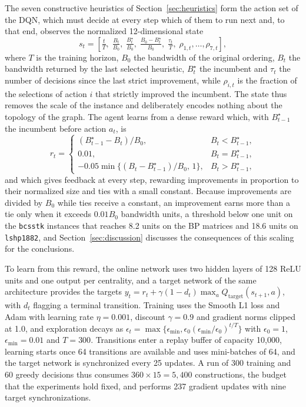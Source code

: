 \documentclass[runningheads]{llncs}
\begin{document}
The seven constructive heuristics of Section~\ref{sec:heuristics} form the action set of the DQN, which must decide at every step which of them to run next and, to that end, observes the normalized 12-dimensional state
\[
s_t =
\left[
\tfrac{t}{T},\;
\tfrac{B_t}{B_0},\;
\tfrac{B_t^\star}{B_0},\;
\tfrac{B_0-B_t^\star}{B_0},\;
\tfrac{\tau_t}{T},\;
\rho_{1,t},\ldots,\rho_{7,t}
\right],
\]
where $T$ is the training horizon, $B_0$ the bandwidth of the original ordering, $B_t$ the bandwidth returned by the last selected heuristic, $B_t^\star$ the incumbent and $\tau_t$ the number of decisions since the last strict improvement, while $\rho_{i,t}$ is the fraction of the selections of action $i$ that strictly improved the incumbent. The state thus removes the scale of the instance and deliberately encodes nothing about the topology of the graph. The agent learns from a dense reward which, with $B^\star_{t-1}$ the incumbent before action $a_t$, is
\[
r_t =
\begin{cases}
(B^\star_{t-1}-B_t)/B_0, & B_t < B^\star_{t-1},\\
0.01, & B_t = B^\star_{t-1},\\
-0.05\min\{(B_t-B^\star_{t-1})/B_0,\,1\}, & B_t > B^\star_{t-1},
\end{cases}
\]
and which gives feedback at every step, rewarding improvements in proportion to their normalized size and ties with a small constant. Because improvements are divided by $B_0$ while ties receive a constant, an improvement earns more than a tie only when it exceeds $0.01B_0$ bandwidth units, a threshold below one unit on the \texttt{bcsstk} instances that reaches 8.2 units on the BP matrices and 18.6 units on \texttt{lshp1882}, and Section~\ref{sec:discussion} discusses the consequences of this scaling for the conclusions.

To learn from this reward, the online network uses two hidden layers of 128 ReLU units and one output per centrality, and a target network of the same architecture provides the targets $y_t = r_t + \gamma (1-d_t)\max_a Q_{\mathrm{target}}(s_{t+1},a)$, with $d_t$ flagging a terminal transition. Training uses the Smooth L1 loss and Adam with learning rate $\eta = 0.001$, discount $\gamma = 0.9$ and gradient norms clipped at 1.0, and exploration decays as $\epsilon_t=\max\{\epsilon_{\min},\epsilon_0(\epsilon_{\min}/\epsilon_0)^{t/T}\}$ with $\epsilon_0 = 1$, $\epsilon_{\min}=0.01$ and $T=300$. Transitions enter a replay buffer of capacity 10,000, learning starts once 64 transitions are available and uses mini-batches of 64, and the target network is synchronized every 25 updates. A run of 300 training and 60 greedy decisions thus consumes $360\times15=5{,}400$ constructions, the budget that the experiments hold fixed, and performs 237 gradient updates with nine target synchronizations.
\end{document}
